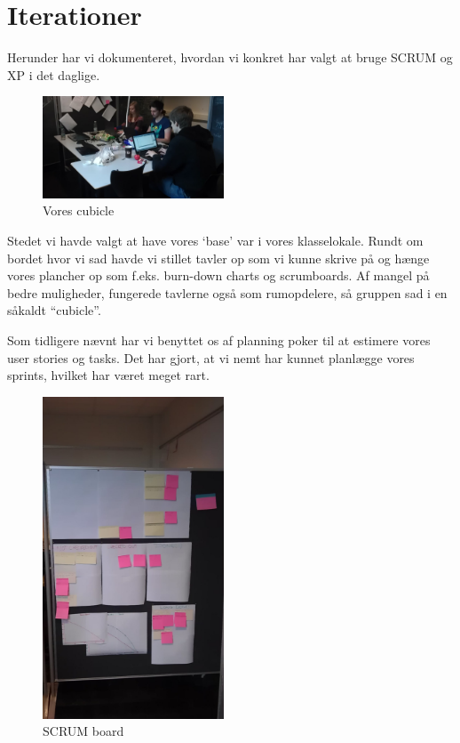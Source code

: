 \documentclass[12pt, a4paper]{report}
\begin{document}
\section{Iterationer}

Herunder har vi dokumenteret, hvordan vi konkret har valgt at bruge SCRUM og XP i det daglige.

\begin{figure}
\begin{center}
\includegraphics[width=0.48\textwidth]{ziriuzarbejde}
\end{center}
\vspace{-0.5cm}
\caption{Vores cubicle}
\label{cubicle}
\end{figure}

Stedet vi havde valgt at have vores ‘base’ var i vores klasselokale. Rundt om bordet hvor vi sad havde vi stillet tavler op som vi kunne skrive på og hænge vores plancher op som f.eks. burn-down charts og scrumboards. Af mangel på bedre muligheder, fungerede tavlerne også som rumopdelere, så gruppen sad i en såkaldt “cubicle”.

Som tidligere nævnt har vi benyttet os af planning poker til at estimere vores user stories og tasks. Det har gjort, at vi nemt har kunnet planlægge vores sprints, hvilket har været meget rart.

\begin{figure}
\begin{center}
\includegraphics[width=0.48\textwidth]{scrumboard}
\caption{SCRUM board}
\end{center}
\label{s_board}
\end{figure}
\end{document}
